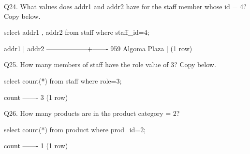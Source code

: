Q24. What values does addr1 and addr2 have for the staff member whose id = 4?  Copy below.
\begin{sql}
    select addr1 , addr2 from staff where staff_id=4;
\end{sql}
\begin{pseudo*}
      addr1       | addr2
------------------+-------
 959 Algoma Plaza |
(1 row)
\end{pseudo*}

Q25. How many members of staff have the role value of 3?  Copy below.
\begin{sql}
select count(*) from staff where role=3;
\end{sql}
\begin{pseudo*}
 count
-------
     3
(1 row)
\end{pseudo*}

Q26. How many products are in the product category = 2?
\begin{sql}
select count(*) from product where prod_id=2;
\end{sql}
\begin{pseudo*}
 count
-------
     1
(1 row)
\end{pseudo*}